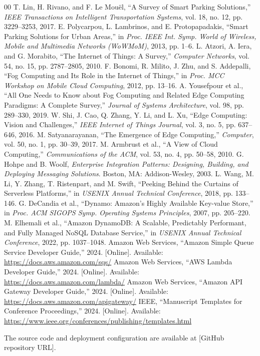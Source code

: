 \documentclass[conference]{IEEEtran}
\begin{document}
\begin{thebibliography}{00}
 T. Lin, H. Rivano, and F. Le Mou\"el, ``A Survey of Smart Parking Solutions,'' \emph{IEEE Transactions on Intelligent Transportation Systems}, vol. 18, no. 12, pp. 3229--3253, 2017.
 E. Polycarpou, L. Lambrinos, and E. Protopapadakis, ``Smart Parking Solutions for Urban Areas,'' in \emph{Proc. IEEE Int. Symp. World of Wireless, Mobile and Multimedia Networks (WoWMoM)}, 2013, pp. 1--6.
 L. Atzori, A. Iera, and G. Morabito, ``The Internet of Things: A Survey,'' \emph{Computer Networks}, vol. 54, no. 15, pp. 2787--2805, 2010.
 F. Bonomi, R. Milito, J. Zhu, and S. Addepalli, ``Fog Computing and Its Role in the Internet of Things,'' in \emph{Proc. MCC Workshop on Mobile Cloud Computing}, 2012, pp. 13--16.
 A. Yousefpour et al., ``All One Needs to Know about Fog Computing and Related Edge Computing Paradigms: A Complete Survey,'' \emph{Journal of Systems Architecture}, vol. 98, pp. 289--330, 2019.
 W. Shi, J. Cao, Q. Zhang, Y. Li, and L. Xu, ``Edge Computing: Vision and Challenges,'' \emph{IEEE Internet of Things Journal}, vol. 3, no. 5, pp. 637--646, 2016.
 M. Satyanarayanan, ``The Emergence of Edge Computing,'' \emph{Computer}, vol. 50, no. 1, pp. 30--39, 2017.
 M. Armbrust et al., ``A View of Cloud Computing,'' \emph{Communications of the ACM}, vol. 53, no. 4, pp. 50--58, 2010.
 G. Hohpe and B. Woolf, \emph{Enterprise Integration Patterns: Designing, Building, and Deploying Messaging Solutions}. Boston, MA: Addison-Wesley, 2003.
 L. Wang, M. Li, Y. Zhang, T. Ristenpart, and M. Swift, ``Peeking Behind the Curtains of Serverless Platforms,'' in \emph{USENIX Annual Technical Conference}, 2018, pp. 133--146.
 G. DeCandia et al., ``Dynamo: Amazon's Highly Available Key-value Store,'' in \emph{Proc. ACM SIGOPS Symp. Operating Systems Principles}, 2007, pp. 205--220.
 M. Elhemali et al., ``Amazon DynamoDB: A Scalable, Predictably Performant, and Fully Managed NoSQL Database Service,'' in \emph{USENIX Annual Technical Conference}, 2022, pp. 1037--1048.
 Amazon Web Services, ``Amazon Simple Queue Service Developer Guide,'' 2024. [Online]. Available: \url{https://docs.aws.amazon.com/sqs/}
 Amazon Web Services, ``AWS Lambda Developer Guide,'' 2024. [Online]. Available: \url{https://docs.aws.amazon.com/lambda/}
 Amazon Web Services, ``Amazon API Gateway Developer Guide,'' 2024. [Online]. Available: \url{https://docs.aws.amazon.com/apigateway/}
 IEEE, ``Manuscript Templates for Conference Proceedings,'' 2024. [Online]. Available: \url{https://www.ieee.org/conferences/publishing/templates.html}
\end{thebibliography}

The source code and deployment configuration are available at [GitHub repository URL].
\end{document}
